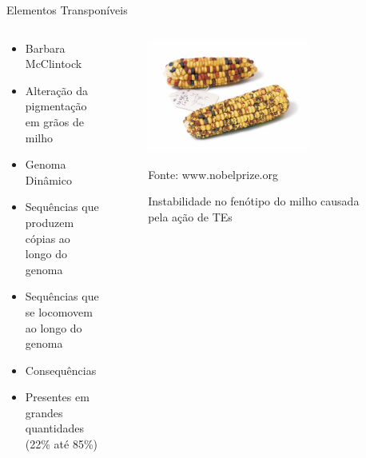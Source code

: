 \documentclass[%
  xcolor=table,%
  10pt,%
  aspectratio = 169,%
  compress,%
  t,%
]{beamer}%
\begin{document}
\begin{frame}{}{Elementos Transponíveis}
    \begin{columns}
        \begin{column}{0.5\textwidth}
            \begin{itemize}
                \item Barbara McClintock
                \item Alteração da pigmentação em grãos de milho
                \item Genoma Dinâmico
                \item Sequências que produzem cópias ao longo do genoma
                \item Sequências que se locomovem ao longo do genoma
                \item Consequências
                \item Presentes em grandes quantidades (22\% até 85\%)
            \end{itemize}       
        \end{column}
        \begin{column}{0.5\textwidth}  %
            \begin{center}
                \begin{figure}
                    \centering
                    \includegraphics[width = 0.7\textwidth]{./Figuras/te-maize.jpg}
                    \caption{Instabilidade no fenótipo do milho causada pela ação de TEs}
                    \scriptsize Fonte: www.nobelprize.org %
                    \label{fig:maize-phenotype-instability}
                \end{figure}
             \end{center}
        \end{column}
    \end{columns}
\end{frame}
\end{document}
